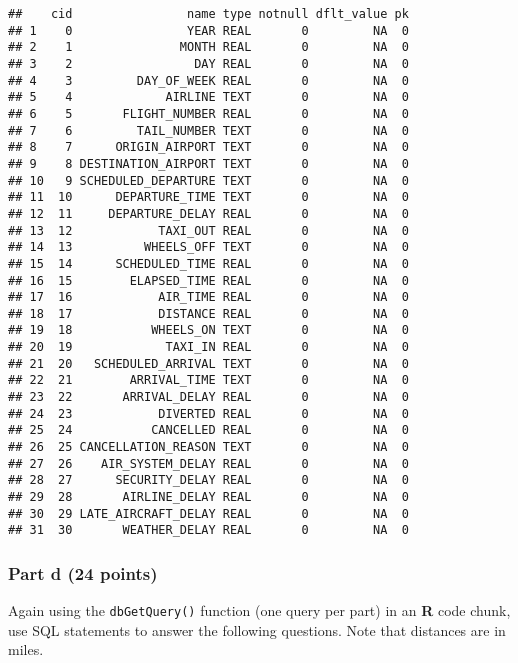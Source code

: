 \documentclass[
]{article}
\begin{document}
\begin{verbatim}
##    cid                name type notnull dflt_value pk
## 1    0                YEAR REAL       0         NA  0
## 2    1               MONTH REAL       0         NA  0
## 3    2                 DAY REAL       0         NA  0
## 4    3         DAY_OF_WEEK REAL       0         NA  0
## 5    4             AIRLINE TEXT       0         NA  0
## 6    5       FLIGHT_NUMBER REAL       0         NA  0
## 7    6         TAIL_NUMBER TEXT       0         NA  0
## 8    7      ORIGIN_AIRPORT TEXT       0         NA  0
## 9    8 DESTINATION_AIRPORT TEXT       0         NA  0
## 10   9 SCHEDULED_DEPARTURE TEXT       0         NA  0
## 11  10      DEPARTURE_TIME TEXT       0         NA  0
## 12  11     DEPARTURE_DELAY REAL       0         NA  0
## 13  12            TAXI_OUT REAL       0         NA  0
## 14  13          WHEELS_OFF TEXT       0         NA  0
## 15  14      SCHEDULED_TIME REAL       0         NA  0
## 16  15        ELAPSED_TIME REAL       0         NA  0
## 17  16            AIR_TIME REAL       0         NA  0
## 18  17            DISTANCE REAL       0         NA  0
## 19  18           WHEELS_ON TEXT       0         NA  0
## 20  19             TAXI_IN REAL       0         NA  0
## 21  20   SCHEDULED_ARRIVAL TEXT       0         NA  0
## 22  21        ARRIVAL_TIME TEXT       0         NA  0
## 23  22       ARRIVAL_DELAY REAL       0         NA  0
## 24  23            DIVERTED REAL       0         NA  0
## 25  24           CANCELLED REAL       0         NA  0
## 26  25 CANCELLATION_REASON TEXT       0         NA  0
## 27  26    AIR_SYSTEM_DELAY REAL       0         NA  0
## 28  27      SECURITY_DELAY REAL       0         NA  0
## 29  28       AIRLINE_DELAY REAL       0         NA  0
## 30  29 LATE_AIRCRAFT_DELAY REAL       0         NA  0
## 31  30       WEATHER_DELAY REAL       0         NA  0
\end{verbatim}

\hypertarget{part-d-24-points}{%
\subsubsection{Part d (24 points)}\label{part-d-24-points}}

Again using the \texttt{dbGetQuery()} function (one query per part) in
an \textbf{R} code chunk, use SQL statements to answer the following
questions. Note that distances are in miles.
\end{document}
